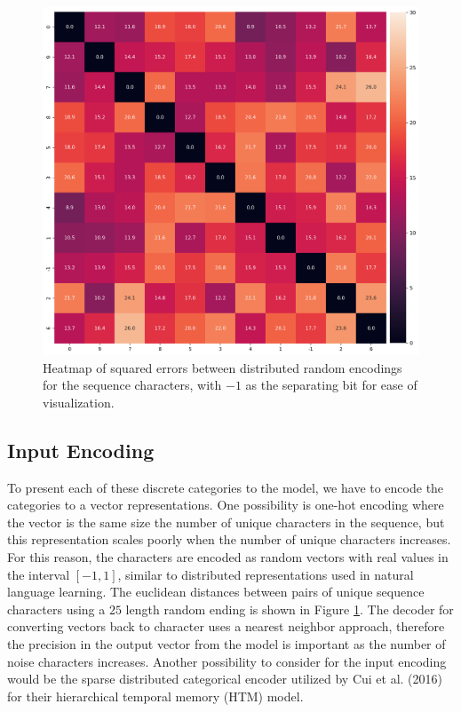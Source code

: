 \documentclass{article}
\begin{document}
\begin{figure}[!h]
    \centering
    \includegraphics[width=0.7\linewidth]{matrix-distances.png}
    \caption{Heatmap of squared errors between distributed random encodings for the sequence characters, with $-1$ as the separating bit for ease of visualization.}
    \label{fig:encoding-distance}
\end{figure}

\subsection*{Input Encoding}

To present each of these discrete categories to the model, we have to encode the categories to a vector representations. One possibility is one-hot encoding where the vector is the same size the number of unique characters in the sequence, but this representation scales poorly when the number of unique characters increases. For this reason, the characters are encoded as random vectors with real values in the interval $\left[-1, 1\right]$, similar to distributed representations used in natural language learning. \cite{mikolov2013distributed} The euclidean distances between pairs of unique sequence characters using a $25$ length random ending is shown in Figure \ref{fig:encoding-distance}. The decoder for converting vectors back to character uses a nearest neighbor approach, therefore the precision in the output vector from the model is important as the number of noise characters increases. Another possibility to consider for the input encoding would be the sparse distributed categorical encoder utilized by Cui et al. (2016) for their hierarchical temporal memory (HTM) model.
\end{document}
